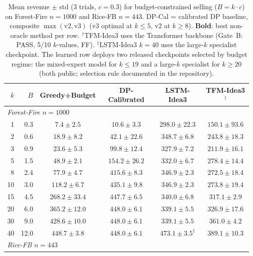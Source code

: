 \begin{table}[t]
\centering
\caption{%
  Mean revenue $\pm$ std (3 trials, $c=0.3$) for budget-constrained selling
  ($B = k \cdot c$) on Forest-Fire $n{=}1000$ and Rice-FB $n{=}443$.
  DP-Cal = calibrated DP baseline, composite $\max(\text{v2},\text{v3})$
  (v3 optimal at $k\!\le\!5$, v2 at $k\!\ge\!8$).
  \textbf{Bold}: best non-oracle method per row.
  $^\dagger$TFM-Idea3 uses the Transformer backbone (Gate~B: PASS, 5/10 $k$-values, FF).
  $^\ddagger$LSTM-Idea3 $k{=}40$ uses the large-$k$ specialist checkpoint.
  The learned row deploys two released checkpoints selected by budget regime:
  the mixed-expert model for $k{\le}19$ and a large-$k$ specialist for $k{\ge}20$
  (both public; selection rule documented in the repository).
}
\label{tab:idea3}
\setlength{\tabcolsep}{4pt}
\begin{tabular}{r r cccc}
\toprule
$k$ & $B$ & Greedy+Budget & DP-Calibrated & LSTM-Idea3 & TFM-Idea3$^\dagger$ \\
\midrule
\multicolumn{6}{l}{\textit{Forest-Fire $n=1000$}} \\
\midrule
 1 &  0.3 & $  7.4 \pm  2.5$ & $  10.6 \pm  3.3$ & $\mathbf{298.0 \pm 22.3}$ & $ 150.1 \pm 93.6$ \\
 2 &  0.6 & $ 18.9 \pm  8.2$ & $  42.1 \pm 22.6$ & $\mathbf{348.7 \pm  6.8}$ & $ 243.8 \pm 18.3$ \\
 3 &  0.9 & $ 23.6 \pm  5.3$ & $  99.8 \pm 12.4$ & $\mathbf{327.9 \pm  7.2}$ & $ 211.9 \pm 16.1$ \\
 5 &  1.5 & $ 48.9 \pm  2.1$ & $ 154.2 \pm 26.2$ & $\mathbf{332.0 \pm  6.7}$ & $ 278.4 \pm 14.4$ \\
 8 &  2.4 & $ 77.9 \pm  4.7$ & $ 415.6 \pm  8.3$ & $\mathbf{346.9 \pm  2.3}$ & $ 272.5 \pm 18.4$ \\
10 &  3.0 & $118.2 \pm  6.7$ & $\mathbf{435.1 \pm  9.8}$ & $ 346.9 \pm  2.3$ & $ 273.8 \pm 19.4$ \\
15 &  4.5 & $268.2 \pm 33.4$ & $\mathbf{447.7 \pm  6.5}$ & $ 340.0 \pm  6.8$ & $ 317.1 \pm  2.9$ \\
20 &  6.0 & $365.2 \pm 12.0$ & $\mathbf{448.0 \pm  6.1}$ & $ 339.1 \pm  5.5$ & $ 326.9 \pm 17.6$ \\
30 &  9.0 & $428.6 \pm 10.0$ & $\mathbf{448.0 \pm  6.1}$ & $ 339.1 \pm  5.5$ & $ 361.0 \pm  4.2$ \\
40 & 12.0 & $448.7 \pm  3.8$ & $448.0 \pm  6.1$ & $\mathbf{473.1 \pm  3.5}^{\ddagger}$ & $ 389.1 \pm 10.3$ \\
\midrule
\multicolumn{6}{l}{\textit{Rice-FB $n=443$}} \\

\end{tabular}
\end{table}
